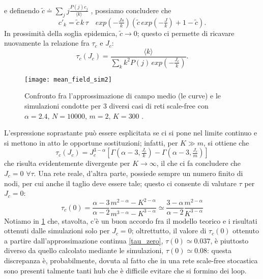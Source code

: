 e definendo $ \tilde{c} \doteq \sum_j j \tfrac{P\left(j\right) c_j}{\langle k \rangle} $ \cite{Bagnoli2014}, possiamo concludere che 
\begin{equation}
	c'_k = \tilde{c} \, k \, \tau \quad exp(- \tfrac{J s}{k}) \left(\tilde{c} \, exp(- \tfrac{J}{k}) + 1 - \tilde{c}\right).
\end{equation}
In prossimità della soglia epidemica, $ \tilde{c} \to 0 $; questo ci permette di ricavare nuovamente la relazione fra $ \tau_c $ e $ J_c $:
\begin{equation}
	\tau_c\left(J_c\right) = \frac{\langle k \rangle}{\sum_k k^2 P\left(j\right) \, exp(-\tfrac{J_c}{k})}.
\end{equation}
\begin{figure}[t]
		\begin{center}
			\texttt{[image: mean\_field\_sim2]}
			\caption{Confronto fra l'approssimazione di campo medio (le curve) e le simulazioni condotte per $ 3 $ diversi casi di reti scale-free con $ \alpha = 2.4, \, N = 10000, \, m = 2, \, K = 300 $ \cite{Bagnoli2014} .}
			\label{fig:sim2}
		\end{center}
\end{figure}
L'espressione soprastante può essere esplicitata se ci si pone nel limite continuo e si mettono in atto le opportune sostituzioni; infatti, per $ K \gg m $, si ottiene che
\begin{equation}
	\tau_c \left(J_c \right) = J_{c}^{3 - \alpha} \left[ \Gamma \left( \alpha - 3, \tfrac{J_c}{k} \right) - \Gamma \left( \alpha - 3, \tfrac{J_c}{m}\right) \right] 	 
\end{equation}
che risulta evidentemente divergente per $ K \to \infty $, il che ci fa concludere che $ J_c = 0$ $\forall \tau$. Una rete reale, d'altra parte, possiede sempre un numero finito di nodi, per cui anche il taglio deve essere tale; questo ci consente di valutare $ \tau $ per $ J_c = 0 $:
\begin{equation}
	\tau_c\left(0\right) = \frac{\alpha - 3}{\alpha - 2} \frac{m^{2 - \alpha} - K^{2 - \alpha}}{m^{3 - \alpha} - K^{3 - \alpha}} \simeq \frac{3 - \alpha}{\alpha - 2} \frac{m^{2 - \alpha}}{K^{3 - \alpha}}
	\label{tau_zero}
\end{equation}
Notiamo in \cref{fig:sim2} che, stavolta, c'è un buon accordo fra il modello teorico e i risultati ottenuti dalle simulazioni solo per $ J_c = 0 $; oltrettutto, il valore di $ \tau_c\left(0\right) $ ottenuto a partire dall'approssimazione continua \eqref{tau_zero}, $ \tau\left(0\right) \simeq 0.037 $, è piuttosto diverso da quello calcolato mediante le simulazioni, $ \tau\left(0\right) \simeq 0.08 $: questa discrepanza è, probabilmente, dovuta al fatto che in una rete scale-free stocastica sono presenti talmente tanti hub che è difficile evitare che si formino dei loop.
